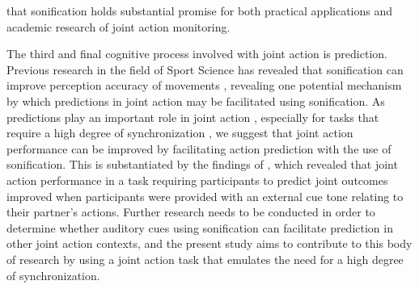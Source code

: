 \documentclass[10pt,a4paper,onecolumn]{article}
\begin{document}
that sonification holds substantial promise for both practical applications and academic research of joint action monitoring.

The third and final cognitive process involved with joint action is prediction. Previous research in the field of Sport Science has revealed that sonification can improve perception accuracy of movements \autocite{effenbergMovementSonificationEffects2005,schmitzObservationSonifiedMovements2013}, revealing one potential mechanism by which predictions in joint action may be facilitated using sonification. As predictions play an important role in joint action \autocite{sebanzJointActionBodies2006}, especially for tasks that require a high degree of synchronization \autocite{vesperMinimalArchitectureJoint2010}, we suggest that joint action performance can be improved by facilitating action prediction with the use of sonification. This is substantiated by the findings of \textcite{knoblichActionCoordinationGroups2003}, which revealed that joint action performance in a task requiring participants to predict joint outcomes improved when participants were provided with an external cue tone relating to their partner's actions. Further research needs to be conducted in order to determine whether auditory cues using sonification can facilitate prediction in other joint action contexts, and the present study aims to contribute to this body of research by using a joint action task that emulates the need for a high degree of synchronization.
\end{document}
